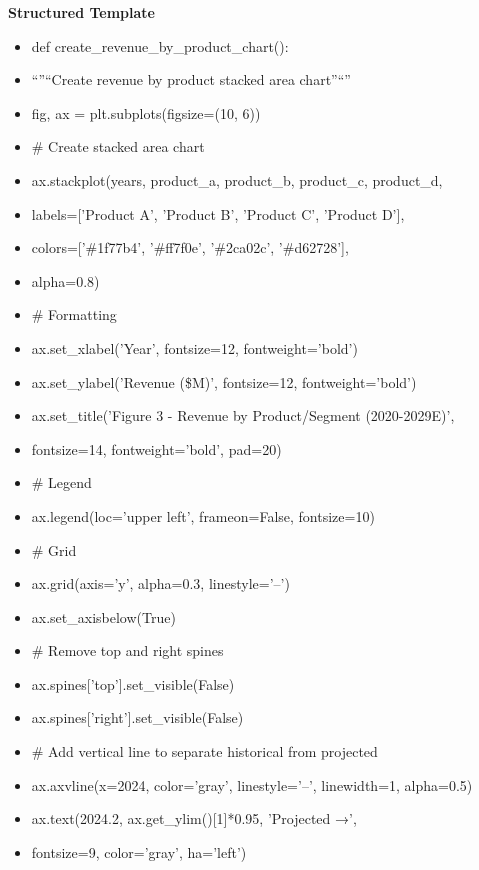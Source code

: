 \documentclass[11pt]{article}
\begin{document}
\textbf{Structured Template}
\begin{itemize}[leftmargin=*,itemsep=2pt,topsep=2pt]
\item {} def create\_\allowbreak{}revenue\_\allowbreak{}by\_\allowbreak{}product\_\allowbreak{}chart():
\item {} ``''``Create revenue by product stacked area chart''``''
\item {} fig, ax = plt.subplots(figsize=(10, 6))
\item {} \# Create stacked area chart
\item {} ax.stackplot(years, product\_\allowbreak{}a, product\_\allowbreak{}b, product\_\allowbreak{}c, product\_\allowbreak{}d,
\item {} labels=['Product A', 'Product B', 'Product C', 'Product D'],
\item {} colors=['\#1f77b4', '\#ff7f0e', '\#2ca02c', '\#d62728'],
\item {} alpha=0.8)
\item {} \# Formatting
\item {} ax.set\_\allowbreak{}xlabel('Year', fontsize=12, fontweight='bold')
\item {} ax.set\_\allowbreak{}ylabel('Revenue (\$M)', fontsize=12, fontweight='bold')
\item {} ax.set\_\allowbreak{}title('Figure 3 - Revenue by Product/Segment (2020-2029E)',
\item {} fontsize=14, fontweight='bold', pad=20)
\item {} \# Legend
\item {} ax.legend(loc='upper left', frameon=False, fontsize=10)
\item {} \# Grid
\item {} ax.grid(axis='y', alpha=0.3, linestyle='--')
\item {} ax.set\_\allowbreak{}axisbelow(True)
\item {} \# Remove top and right spines
\item {} ax.spines['top'].set\_\allowbreak{}visible(False)
\item {} ax.spines['right'].set\_\allowbreak{}visible(False)
\item {} \# Add vertical line to separate historical from projected
\item {} ax.axvline(x=2024, color='gray', linestyle='--', linewidth=1, alpha=0.5)
\item {} ax.text(2024.2, ax.get\_\allowbreak{}ylim()[1]*0.95, 'Projected →',
\item {} fontsize=9, color='gray', ha='left')

\end{itemize}
\end{document}

